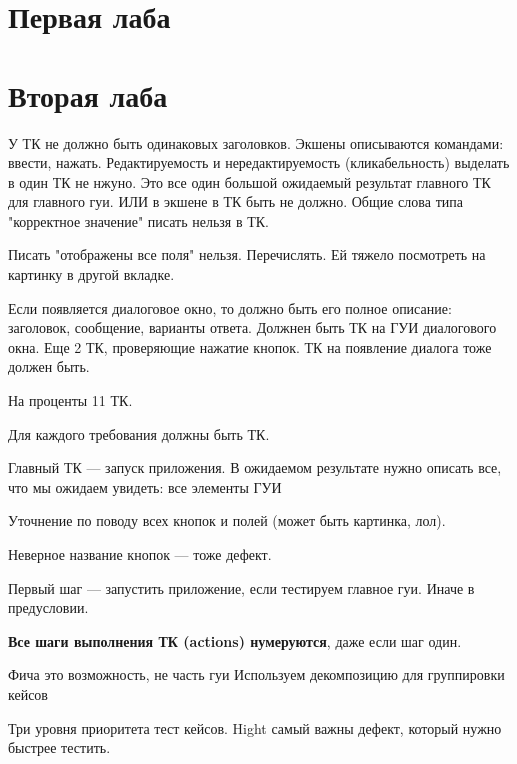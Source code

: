 





\section{Первая лаба}





\section{Вторая лаба}

У ТК не должно быть одинаковых заголовков. Экшены описываются командами:
ввести, нажать. Редактируемость и нередактируемость (кликабельность) выделать в один ТК не
нжуно. Это все один большой ожидаемый результат главного ТК для главного гуи.
ИЛИ в экшене в ТК быть не должно. Общие слова типа "корректное значение" писать
нельзя в ТК.

Писать "отображены все поля" нельзя. Перечислять. Ей тяжело посмотреть на
картинку в другой вкладке.

Если появляется диалоговое окно, то должно быть его полное описание: заголовок,
сообщение, варианты ответа. Должнен быть ТК на ГУИ диалогового окна. Еще 2 ТК,
проверяющие нажатие кнопок. ТК на появление диалога тоже должен быть.

На проценты 11 ТК.

Для каждого требования должны быть ТК.

Главный ТК --- запуск приложения. В ожидаемом результате нужно описать все, что
мы ожидаем увидеть: все элементы ГУИ

Уточнение по поводу всех кнопок и полей (может быть картинка, лол).

Неверное название кнопок --- тоже дефект.

Первый шаг --- запустить приложение, если тестируем главное гуи. Иначе в
предусловии.

\textbf{Все шаги выполнения ТК (actions) нумеруются}, даже если шаг один.

Фича это возможность, не часть гуи
Используем декомпозицию для группировки кейсов

Три уровня приоритета тест кейсов. Hight самый важны дефект, который нужно
быстрее тестить. 

